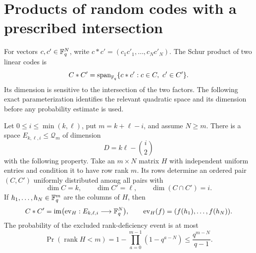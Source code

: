 \section{Products of random codes with a prescribed intersection}
\label{sec:code-products}

For vectors $c,c'\in\mathbb F_q^N$, write
$c*c'=(c_1c'_1,\ldots,c_Nc'_N)$.  The Schur product of two linear
codes is
\[
 C*C'=\operatorname{span}_{\F_q}\{c*c':c\in C,\ c'\in C'\}.
\]
Its dimension is sensitive to the intersection of the two factors.
The following exact parameterization identifies the relevant quadratic
space and its dimension before any probability estimate is used.

\begin{proposition}
\label{prop:code-parameterization}
Let $0\le i\le\min(k,\ell)$, put $m=k+\ell-i$, and assume $N\ge m$.
There is a space $E_{k,\ell,i}\le\mathcal Q_m$ of dimension
\begin{equation}\label{eq:product-dimension}
 D=k\ell-\binom i2
\end{equation}
with the following property.  Take an $m\times N$ matrix $H$ with
independent uniform entries and condition it to have row rank $m$.
Its rows determine an ordered pair $(C,C')$ uniformly distributed among
all pairs with
\[
 \dim C=k,\qquad \dim C'=\ell,\qquad \dim(C\cap C')=i.
\]
If $h_1,\ldots,h_N\in\mathbb F_q^m$ are the columns of $H$, then
\begin{equation}\label{eq:product-evaluation}
 C*C'=\operatorname{im}\bigl(\operatorname{ev}_H:E_{k,\ell,i}
       \longrightarrow\mathbb F_q^N\bigr),\qquad
 \operatorname{ev}_H(f)=(f(h_1),\ldots,f(h_N)).
\end{equation}
The probability of the excluded rank-deficiency event is at most
\begin{equation}\label{eq:frame-conditioning}
 \Pr(\operatorname{rank}H<m)
 =1-\prod_{a=0}^{m-1}(1-q^{a-N})
 \le \frac{q^{m-N}}{q-1}.
\end{equation}
\end{proposition}

